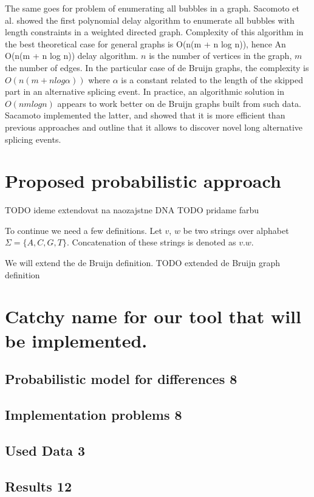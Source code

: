 The same goes for problem of enumerating all bubbles in a graph.
Sacomoto et al. \cite{sacomoto2013polynomial} showed the first polynomial delay algorithm to enumerate all bubbles with length constraints in a weighted directed graph. 
Complexity of this algorithm in the best theoretical case for general graphs
is O(n(m + n log n)), hence An O(n(m + n log n)) delay algorithm. 
$n$ is the number of vertices in the graph, $m$ the number of edges. 
In the particular case of de Bruijn graphs, the complexity is $O(n(m + n log \alpha))$ where $\alpha$ is a constant related to the length of the skipped part in an alternative splicing event. 
In practice, an algorithmic solution in $O(nm log n)$ appears to work better on de Bruijn graphs built from such data. 
Sacamoto implemented the latter, and showed that it is more efficient than previous approaches and outline that it allows to discover novel long alternative splicing events.

\chapter{Proposed probabilistic approach}

TODO ideme extendovat na naozajstne DNA
TODO pridame farbu


To continue we need a few definitions. Let $v$, $w$ be two strings over alphabet $\Sigma = \{A, C, G, T \}$. Concatenation of these strings is denoted as $v . w$. 

We will extend the de Bruijn definition. TODO extended de Bruijn graph definition


\chapter{Catchy name for our tool that will be implemented.}
	\section{Probabilistic model for differences 8}
	\section{Implementation problems 8}
	\section{Used Data 3}
	\section{Results 12}
